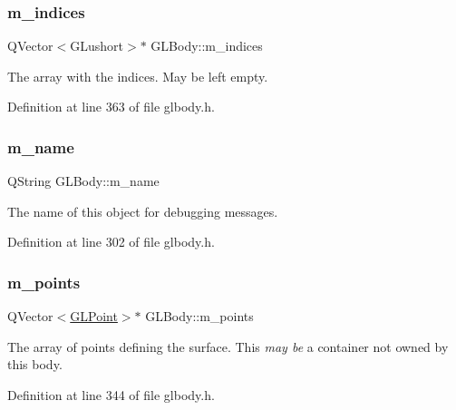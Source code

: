 \mbox{\label{class_g_l_body_a0ac1c7cdd34662989db4204735f05aca}} 
\subsubsection{\texorpdfstring{m\_indices}{m\_indices}}
{\footnotesize\ttfamily Q\+Vector$<$G\+Lushort$>$$\ast$ G\+L\+Body\+::m\+\_\+indices\hspace{0.3cm}{\ttfamily [protected]}}

The array with the indices. May be left empty. 

Definition at line 363 of file glbody.\+h.

\mbox{\label{class_g_l_body_a348178ac24c376d6ebfe280ce30ff9c4}} 
\subsubsection{\texorpdfstring{m\_name}{m\_name}}
{\footnotesize\ttfamily Q\+String G\+L\+Body\+::m\+\_\+name\hspace{0.3cm}{\ttfamily [protected]}}

The name of this object for debugging messages. 

Definition at line 302 of file glbody.\+h.

\mbox{\label{class_g_l_body_a8e157d4bf676d1c5af7f74d30d44ea12}} 
\subsubsection{\texorpdfstring{m\_points}{m\_points}}
{\footnotesize\ttfamily Q\+Vector$<$\mbox{\hyperlink{class_g_l_point}{G\+L\+Point}}$>$$\ast$ G\+L\+Body\+::m\+\_\+points\hspace{0.3cm}{\ttfamily [protected]}}

The array of points defining the surface. This {\itshape may be} a container not owned by this body. 

Definition at line 344 of file glbody.\+h.

\mbox{\label{class_g_l_body_a96006c2b453ffe0490bee1961e61e3b3}} 
